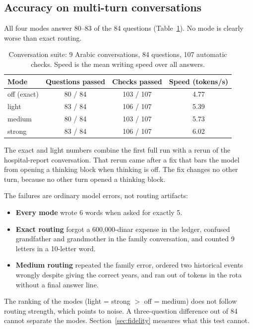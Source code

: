 \subsection{Accuracy on multi-turn conversations}\label{sec:accuracy}
All four modes answer 80--83 of the 84 questions (Table~\ref{tab:accuracy}). No mode is clearly worse than exact routing.

\begin{table}[t]
\centering\small
\caption{Conversation suite: 9 Arabic conversations, 84 questions, 107 automatic checks. Speed is the mean writing speed over all answers.}
\label{tab:accuracy}
\begin{tabular}{lccc}
\toprule
Mode & Questions passed & Checks passed & Speed (tokens/s) \\
\midrule
off (exact) & 80 / 84 & 103 / 107 & 4.77 \\
light & 83 / 84 & 106 / 107 & 5.39 \\
medium & 80 / 84 & 103 / 107 & 5.73 \\
strong & 83 / 84 & 106 / 107 & 6.02 \\
\bottomrule
\end{tabular}
\end{table}

The exact and light numbers combine the first full run with a rerun of the hospital-report conversation. That rerun came after a fix that bars the model from opening a thinking block when thinking is off. The fix changes no other turn, because no other turn opened a thinking block.

The failures are ordinary model errors, not routing artifacts:
\begin{itemize}
  \item \textbf{Every mode} wrote 6 words when asked for exactly 5.
  \item \textbf{Exact routing} forgot a 600,000-dinar expense in the ledger, confused grandfather and grandmother in the family conversation, and counted 9 letters in a 10-letter word.
  \item \textbf{Medium routing} repeated the family error, ordered two historical events wrongly despite giving the correct years, and ran out of tokens in the rota without a final answer line.
\end{itemize}

The ranking of the modes (light = strong $>$ off = medium) does not follow routing strength, which points to noise. A three-question difference out of 84 cannot separate the modes. Section~\ref{sec:fidelity} measures what this test cannot.

